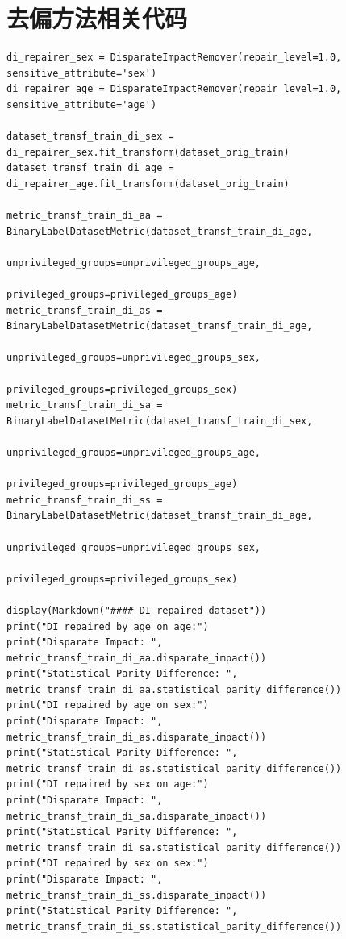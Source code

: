 \documentclass{article}
\begin{document}
\section{去偏方法相关代码}
\begin{lstlisting}
di_repairer_sex = DisparateImpactRemover(repair_level=1.0, sensitive_attribute='sex')
di_repairer_age = DisparateImpactRemover(repair_level=1.0, sensitive_attribute='age')

dataset_transf_train_di_sex = di_repairer_sex.fit_transform(dataset_orig_train)
dataset_transf_train_di_age = di_repairer_age.fit_transform(dataset_orig_train)

metric_transf_train_di_aa = BinaryLabelDatasetMetric(dataset_transf_train_di_age, 
                                                  unprivileged_groups=unprivileged_groups_age,
                                                  privileged_groups=privileged_groups_age)
metric_transf_train_di_as = BinaryLabelDatasetMetric(dataset_transf_train_di_age, 
                                                  unprivileged_groups=unprivileged_groups_sex,
                                                  privileged_groups=privileged_groups_sex)
metric_transf_train_di_sa = BinaryLabelDatasetMetric(dataset_transf_train_di_sex, 
                                                  unprivileged_groups=unprivileged_groups_age,
                                                  privileged_groups=privileged_groups_age)
metric_transf_train_di_ss = BinaryLabelDatasetMetric(dataset_transf_train_di_age, 
                                                  unprivileged_groups=unprivileged_groups_sex,
                                                  privileged_groups=privileged_groups_sex)

display(Markdown("#### DI repaired dataset"))
print("DI repaired by age on age:")
print("Disparate Impact: ", metric_transf_train_di_aa.disparate_impact())
print("Statistical Parity Difference: ", metric_transf_train_di_aa.statistical_parity_difference())
print("DI repaired by age on sex:")
print("Disparate Impact: ", metric_transf_train_di_as.disparate_impact())
print("Statistical Parity Difference: ", metric_transf_train_di_as.statistical_parity_difference())
print("DI repaired by sex on age:")
print("Disparate Impact: ", metric_transf_train_di_sa.disparate_impact())
print("Statistical Parity Difference: ", metric_transf_train_di_sa.statistical_parity_difference())
print("DI repaired by sex on sex:")
print("Disparate Impact: ", metric_transf_train_di_ss.disparate_impact())
print("Statistical Parity Difference: ", metric_transf_train_di_ss.statistical_parity_difference())
\end{lstlisting}
\end{document}
